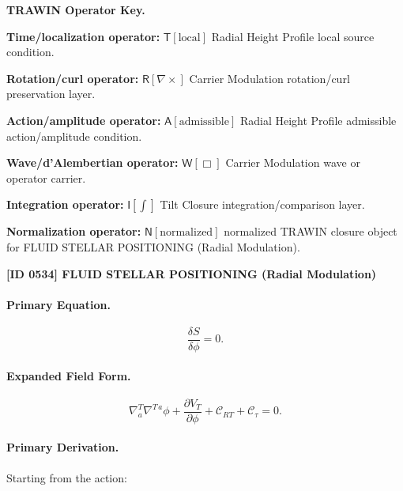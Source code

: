 \par\vspace{0.45\baselineskip}
\noindent\begin{minipage}[t]{\linewidth}
\begingroup
\small
\raggedright
\textbf{TRAWIN Operator Key.}\par
\noindent\textbf{Time/localization operator:} $\mathsf{T}\!\left[\mathrm{local}\right]$ Radial Height Profile local source condition.\par
\noindent\textbf{Rotation/curl operator:} $\mathsf{R}\!\left[\nabla\times\right]$ Carrier Modulation rotation/curl preservation layer.\par
\noindent\textbf{Action/amplitude operator:} $\mathsf{A}\!\left[\mathrm{admissible}\right]$ Radial Height Profile admissible action/amplitude condition.\par
\noindent\textbf{Wave/d'Alembertian operator:} $\mathsf{W}\!\left[\Box\right]$ Carrier Modulation wave or operator carrier.\par
\noindent\textbf{Integration operator:} $\mathsf{I}\!\left[\int\right]$ Tilt Closure integration/comparison layer.\par
\noindent\textbf{Normalization operator:} $\mathsf{N}\!\left[\mathrm{normalized}\right]$ normalized TRAWIN closure object for FLUID STELLAR POSITIONING (Radial Modulation).\par
\endgroup
\end{minipage}

\clearpage
\noindent\textbf{[ID 0534] FLUID STELLAR POSITIONING (Radial Modulation)}\par
\vspace{0.35em}
\paragraph{Primary Equation.}
\begin{equation}
\frac{\delta S}{\delta \phi}=0 .
\end{equation}

\paragraph{Expanded Field Form.}
\begin{equation}
\nabla^T_a\nabla^{T\,a}\phi
+
\frac{\partial V_T}{\partial \phi}
+
\mathcal{C}_{RT}
+
\mathcal{C}_{\tau}
=
0 .
\end{equation}

\paragraph{Primary Derivation.}
Starting from the action:


